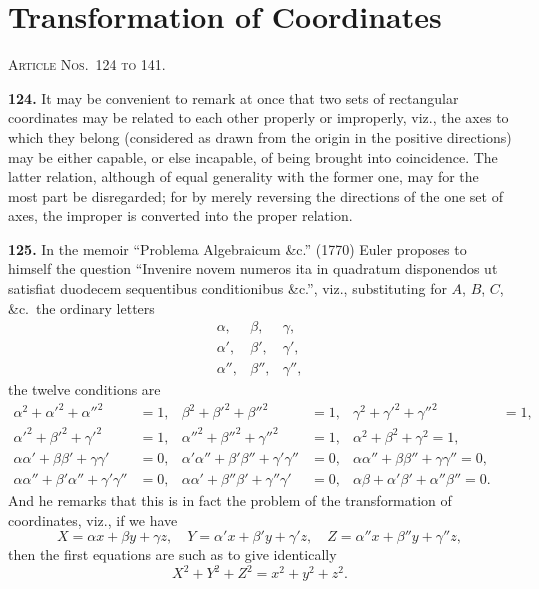 \documentclass[11pt,a4paper]{article}
\theoremstyle{definition}
\begin{document}
\section*{Transformation of Coordinates}
\noindent\textsc{Article Nos.~124 to 141.}

\medskip

\textbf{124.} It may be convenient to remark at once that two sets of rectangular coordinates may be related to each other properly or improperly, viz., the axes to which they belong (considered as drawn from the origin in the positive directions) may be either capable, or else incapable, of being brought into coincidence. The latter relation, although of equal generality with the former one, may for the most part be disregarded; for by merely reversing the directions of the one set of axes, the improper is converted into the proper relation.

\textbf{125.} In the memoir ``Problema Algebraicum \&c.'' (1770) Euler proposes to himself the question ``Invenire novem numeros ita in quadratum disponendos ut satisfiat duodecem sequentibus conditionibus \&c.'', viz., substituting for $A$, $B$, $C$, \&c.\ the ordinary letters
\[
\begin{array}{ccc}
\alpha, & \beta, & \gamma, \\
\alpha', & \beta', & \gamma', \\
\alpha'', & \beta'', & \gamma'',
\end{array}
\]
the twelve conditions are
\begin{align*}
\alpha^2 + \alpha'^2 + \alpha''^2 &= 1, & \beta^2 + \beta'^2 + \beta''^2 &= 1, & \gamma^2 + \gamma'^2 + \gamma''^2 &= 1, \\
\alpha'^2 + \beta'^2 + \gamma'^2 &= 1, & \alpha''^2 + \beta''^2 + \gamma''^2 &= 1, & \alpha^2 + \beta^2 + \gamma^2 = 1, \\
\alpha\alpha' + \beta\beta' + \gamma\gamma' &= 0, & \alpha'\alpha'' + \beta'\beta'' + \gamma'\gamma'' &= 0, & \alpha\alpha'' + \beta\beta'' + \gamma\gamma'' = 0, \\
\alpha\alpha'' + \beta'\alpha'' + \gamma'\gamma'' &= 0, & \alpha\alpha' + \beta''\beta' + \gamma''\gamma' &= 0, & \alpha\beta + \alpha'\beta' + \alpha''\beta'' = 0.
\end{align*}
And he remarks that this is in fact the problem of the transformation of coordinates, viz., if we have
\[
X = \alpha x + \beta y + \gamma z, \quad Y = \alpha' x + \beta' y + \gamma' z, \quad Z = \alpha'' x + \beta'' y + \gamma'' z,
\]
then the first equations are such as to give identically
\[
X^2 + Y^2 + Z^2 = x^2 + y^2 + z^2.
\]
\end{document}
